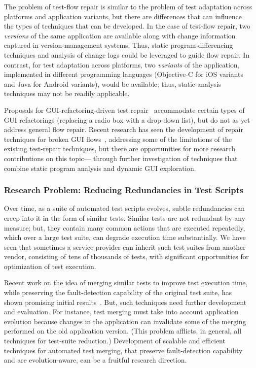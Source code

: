 The problem of test-flow repair is similar to the problem of test adaptation
across platforms and application variants, but there are differences that can
influence the types of techniques that can be developed. In the case of
test-flow repair, two \textit{versions} of the same application are available
along with change information captured in version-management systems. Thus,
static program-differencing techniques and analysis of change logs could be
leveraged to guide flow repair. In contrast, for test adaptation across
platforms, two \textit{variants} of the application, implemented in different
programming languages (\eg Objective-C for iOS variants and Java for Android
variants), would be available; thus, static-analysis techniques may not be
readily applicable.

Proposals for GUI-refactoring-driven test repair~\cite{Daniel2011} accommodate
certain types of GUI refactorings (\eg replacing a radio box with a drop-down
list), but do not as yet address general flow repair.  Recent research has seen
the development of repair techniques for broken GUI flows~\cite{Zhang2013},
addressing some of the limitations of the existing test-repair techniques, but
there are opportunities for more research contributions on this topic---\eg
through further investigation of techniques that combine static program analysis
and dynamic GUI exploration.

\subsubsection*{Research Problem: Reducing Redundancies in Test Scripts}

Over time, as a suite of automated test scripts evolves, subtle redundancies can
creep into it in the form of similar tests. Similar tests are not redundant by
any measure; but, they contain many common actions that are executed repeatedly,
which over a large test suite, can degrade execution time substantially.  We
have seen that sometimes a service provider can inherit such test suites from
another vendor, consisting of tens of thousands of tests, with significant
opportunities for optimization of test execution.

Recent work on the idea of merging similar tests to improve test execution time,
while preserving the fault-detection capability of the original test suite, has
shown promising initial results~\cite{Devaki:2013}. But, such techniques need
further development and evaluation. For instance, test merging must take into
account application evolution because changes in the application can invalidate
some of the merging performed on the old application version. (This problem
afflicts, in general, all techniques for test-suite reduction.)  Development of
scalable and efficient techniques for automated test merging, that preserve
fault-detection capability and are evolution-aware, can be a fruitful research
direction.


